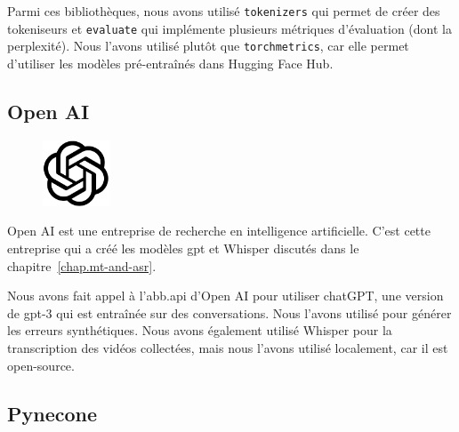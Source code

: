 Parmi ces bibliothèques, nous avons utilisé \verb|tokenizers| qui permet de créer des tokeniseurs
et \verb|evaluate| qui implémente plusieurs métriques d'évaluation (dont la perplexité).
Nous l'avons utilisé plutôt que \verb|torchmetrics|, 
car elle permet d'utiliser les modèles pré-entraînés dans \foreignlanguage{english}{Hugging Face Hub}.

\subsection{\foreignlanguage{english}{Open AI}}%
\label{subsec.openai}

\begin{figure}
    \vspace*{-\topsep}
    \begin{flushright}
        \includegraphics[width=2cm]{assets/images/openai.png}
    \end{flushright}
\end{figure}
\foreignlanguage{english}{Open AI} est une entreprise de recherche en intelligence artificielle.
C'est cette entreprise qui a créé les modèles \gls{gpt} et Whisper discutés dans le chapitre~\ref{chap.mt-and-asr}.

Nous avons fait appel à l'\gls{abb.api} d'\foreignlanguage{english}{Open AI} pour utiliser chatGPT,
une version de \gls{gpt}-3 qui est entraînée sur des conversations.
Nous l'avons utilisé pour générer les erreurs synthétiques.
Nous avons également utilisé Whisper pour la transcription des vidéos collectées,
mais nous l'avons utilisé localement, car il est open-source.

\subsection{Pynecone}%
\label{subsec.pynecone}


